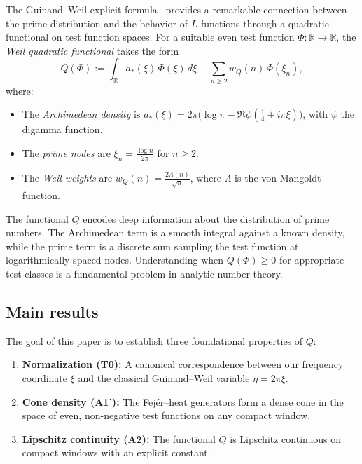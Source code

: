 \documentclass[11pt,a4paper]{article}
\theoremstyle{definition}
\theoremstyle{remark}
\newcommand{\R}{\mathbb{R}}
\begin{document}
The Guinand--Weil explicit formula~\cite{Guinand1948,Weil1952} provides a remarkable connection between the prime distribution and the behavior of $L$-functions through a quadratic functional on test function spaces. For a suitable even test function $\Phi : \R \to \R$, the \emph{Weil quadratic functional} takes the form
\begin{equation}\label{eq:Q-def}
  Q(\Phi) := \int_{\R} a_*(\xi)\, \Phi(\xi)\, d\xi
           - \sum_{n \geq 2} w_Q(n)\, \Phi(\xi_n),
\end{equation}
where:
\begin{itemize}
\item The \emph{Archimedean density} is $a_*(\xi) = 2\pi\bigl(\log\pi - \Re\psi(\tfrac{1}{4} + i\pi\xi)\bigr)$, with $\psi$ the digamma function.
\item The \emph{prime nodes} are $\xi_n = \frac{\log n}{2\pi}$ for $n \geq 2$.
\item The \emph{Weil weights} are $w_Q(n) = \frac{2\Lambda(n)}{\sqrt{n}}$, where $\Lambda$ is the von Mangoldt function.
\end{itemize}

The functional $Q$ encodes deep information about the distribution of prime numbers. The Archimedean term is a smooth integral against a known density, while the prime term is a discrete sum sampling the test function at logarithmically-spaced nodes. Understanding when $Q(\Phi) \geq 0$ for appropriate test classes is a fundamental problem in analytic number theory.

\subsection{Main results}

The goal of this paper is to establish three foundational properties of $Q$:

\begin{enumerate}[label=(\alph*)]
\item \textbf{Normalization (T0):} A canonical correspondence between our frequency coordinate $\xi$ and the classical Guinand--Weil variable $\eta = 2\pi\xi$.

\item \textbf{Cone density (A1'):} The Fej\'er--heat generators form a dense cone in the space of even, non-negative test functions on any compact window.

\item \textbf{Lipschitz continuity (A2):} The functional $Q$ is Lipschitz continuous on compact windows with an explicit constant.
\end{enumerate}
\end{document}
